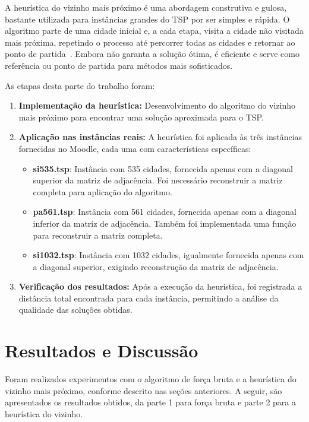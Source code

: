 \documentclass{article}
\begin{document}
A heurística do vizinho mais próximo é uma abordagem construtiva e gulosa, bastante utilizada para instâncias grandes do TSP por ser simples e rápida. O algoritmo parte de uma cidade inicial e, a cada etapa, visita a cidade não visitada mais próxima, repetindo o processo até percorrer todas as cidades e retornar ao ponto de partida~\cite{miy2008heuristicas}. Embora não garanta a solução ótima, é eficiente e serve como referência ou ponto de partida para métodos mais sofisticados.

As etapas desta parte do trabalho foram:

\begin{enumerate}
    \item \textbf{Implementação da heurística:} Desenvolvimento do algoritmo do vizinho mais próximo para encontrar uma solução aproximada para o TSP.
    \item \textbf{Aplicação nas instâncias reais:} A heurística foi aplicada às três instâncias fornecidas no Moodle, cada uma com características específicas:
        \begin{itemize}
            \item \textbf{si535.tsp}: Instância com 535 cidades, fornecida apenas com a diagonal superior da matriz de adjacência. Foi necessário reconstruir a matriz completa para aplicação do algoritmo.
            \item \textbf{pa561.tsp}: Instância com 561 cidades, fornecida apenas com a diagonal inferior da matriz de adjacência. Também foi implementada uma função para reconstruir a matriz completa.
            \item \textbf{si1032.tsp}: Instância com 1032 cidades, igualmente fornecida apenas com a diagonal superior, exigindo reconstrução da matriz de adjacência.
        \end{itemize}
    \item \textbf{Verificação dos resultados:} Após a execução da heurística, foi registrada a distância total encontrada para cada instância, permitindo a análise da qualidade das soluções obtidas.
\end{enumerate}

\section{Resultados e Discussão}

Foram realizados experimentos com o algoritmo de força bruta e a heurística do vizinho mais próximo, conforme descrito nas seções anteriores. A seguir, são apresentados os resultados obtidos, da parte 1 para força bruta e parte 2 para a heurística do vizinho. 
\end{document}
